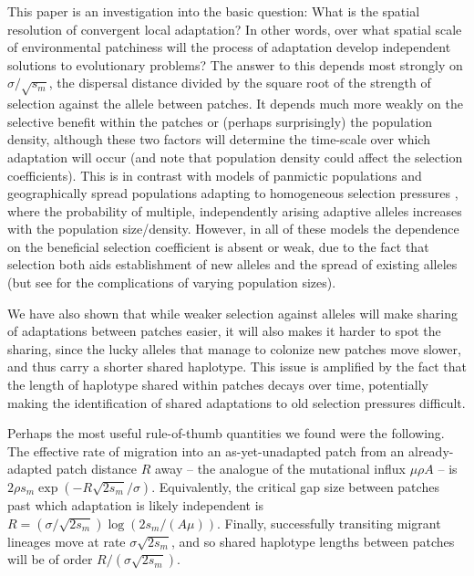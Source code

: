 \documentclass{article}
\newcommand{\citep}[1]{\cite{#1}}
\newcommand{\citet}[1]{\cite{#1}}
\begin{document}
This paper is an investigation into the basic question: 
What is the spatial resolution of convergent local adaptation?
In other words, 
over what spatial scale of environmental patchiness will the process
of adaptation develop independent solutions to evolutionary problems?
The answer to this depends most strongly on $\sigma/\sqrt{s_m}$, 
the dispersal distance divided by the square root of the strength of selection against the allele between patches. 
It depends much more weakly on the
selective benefit within the patches or (perhaps surprisingly) the population density, 
although these two factors will determine the time-scale over which adaptation will occur
(and note that population density could affect the selection coefficients). 
This is in contrast with models of panmictic populations
\citep{softsweepsI, MesserPetrov, Wilson-softsweep} 
and geographically spread populations adapting to homogeneous selection pressures \citep{ralph2010parallel}, 
where the probability of multiple, independently arising adaptive alleles increases with the population size/density. 
However, in all of these models the dependence on the beneficial selection
coefficient is absent or weak, due to the fact that selection both
aids establishment of new alleles and the spread of existing
alleles (but see \citet{Wilson-softsweep} for the complications of varying population sizes). 

We have also shown that
while weaker selection against alleles will make sharing 
of adaptations between patches easier, 
it will also makes it harder to spot the sharing,
since the lucky alleles that manage to colonize new patches move slower,
and thus carry a shorter shared haplotype.
This issue is amplified by the fact that the length of haplotype
shared within patches decays over time, potentially making the
identification of shared adaptations to old selection pressures difficult.

Perhaps the most useful rule-of-thumb quantities we found were the following.
The effective rate of migration into an as-yet-unadapted patch from an already-adapted patch distance $R$ away 
-- the analogue of the mutational influx $\mu \rho A$ --
is $2 \rho s_m \exp(- R \sqrt{2 s_m} / \sigma)$.
Equivalently, the critical gap size between patches past which adaptation is likely independent
is $R = (\sigma/\sqrt{2s_m}) \log(2s_m/(A \mu))$.
Finally, successfully transiting migrant lineages move at rate $\sigma \sqrt{2s_m}$,
and so shared haplotype lengths between patches will be of order $R/(\sigma \sqrt{2s_m})$.
\end{document}
